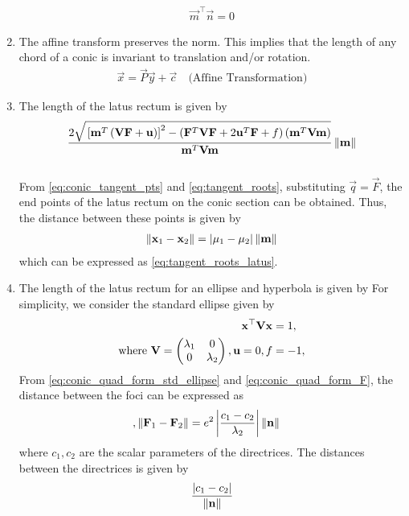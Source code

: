 \documentclass[journal,12pt,twocolumn]{IEEEtran}
\renewcommand\thesection{\arabic{section}}
\renewcommand\thesubsection{\thesection.\arabic{subsection}}
\begin{document}
\begin{enumerate}[label=\thesubsection.\arabic*.,ref=\thesubsection.\theenumi]
\begin{align}
	\vec{m}^{\top} \vec{n} = 0
\end{align}
\item The affine transform preserves the norm.  This implies that the length of any chord of a conic
	is invariant to translation and/or rotation.
	\solution 
\begin{align}
\vec{x} = \vec{P}\vec{y}+\vec{c} \quad \text{(Affine Transformation)}
\label{eq:conic_affine}
\end{align}
\item The length of the latus rectum is given by 
{\tiny
\begin{multline}
 \frac{2\sqrt{
{}\left[
\mathbf{m}^T\left(\mathbf{V}\mathbf{F}+\mathbf{u}\right)
\right]^2
-
\left(
\mathbf{F}^T\mathbf{V}\mathbf{F} + 2\mathbf{u}^T\mathbf{F} +f
\right)
\left(\mathbf{m}^T\mathbf{V}\mathbf{m}\right)
}
}
{
\mathbf{m}^T\mathbf{V}\mathbf{m}
}\left\lVert\mathbf{m}\right\rVert
\label{eq:tangent_roots_latus}
\end{multline}
}
	\\
	\solution From 
\eqref{eq:conic_tangent_pts}
and
\eqref{eq:tangent_roots}, substituting $\vec{q} = \vec{F}$, the end points of the latus rectum on the conic
section can be obtained.  Thus, the distance between these points is given by 
\begin{align}
	\left\lVert\mathbf{x}_1-\mathbf{x}_2\right\rVert =  \left\vert\mu_1-\mu_2\right\vert \left\lVert\mathbf{m}\right\rVert
\label{eq:conic_tangent_pts_dist}
\end{align}
which can be expressed as
\eqref{eq:tangent_roots_latus}.
\item The length of the latus rectum for an ellipse and hyperbola is given by
	\solution For simplicity, we consider the standard ellipse given by 
\begin{align}
	\mathbf{x}^{\top}\mathbf{V}\mathbf{x} &= 1,
	\\
	\text{where }
	\mathbf{V} = \begin{pmatrix}\lambda_1 & 0 \\ 0 & \lambda_2\end{pmatrix}, \mathbf{u} = 0, f &= -1
  \label{eq:conic_quad_form_std_ellipse}, 
\end{align}
From 
  \eqref{eq:conic_quad_form_std_ellipse} and  
  \eqref{eq:conic_quad_form_F}, 
  the distance between the foci can be expressed as
\begin{align}
  \label{eq:conic_quad_form_std_ellipse_foci_dir}, 
	\left\lVert\mathbf{F}_1 - \mathbf{F}_2\right\rVert  &= e^2\left\vert\frac{c_1-c_2}{\lambda_2}\right\vert\left\lVert\mathbf{n}\right\rVert
\end{align}
%
where $c_1,c_2$ are the scalar parameters of the directrices.  The distances between the directrices is given by 
\begin{align}
	\frac{\left\vert c_1-c_2\right\vert}{\left\lVert\mathbf{n}\right\rVert}
\end{align}

\end{enumerate}
\end{document}
